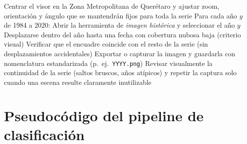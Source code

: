 \begin{algorithm}[H]
\caption{Procedimiento de adquisición manual con Google Earth}
\label{alg:adquisicion}
\begin{algorithmic}[1]
\State Centrar el visor en la Zona Metropolitana de Querétaro y ajustar zoom, orientación y ángulo que se mantendrán fijos para toda la serie
\State Para cada año $y$ de 1984 a 2020:
	\State \quad Abrir la herramienta de \textit{imagen histórica} y seleccionar el año $y$
	\State \quad Desplazarse dentro del año hasta una fecha con cobertura nubosa baja (criterio visual)
	\State \quad Verificar que el encuadre coincide con el resto de la serie (sin desplazamientos accidentales)
	\State \quad Exportar o capturar la imagen y guardarla con nomenclatura estandarizada (p.\ ej.\ \texttt{YYYY.png})
\State Revisar visualmente la continuidad de la serie (saltos bruscos, años atípicos) y repetir la captura solo cuando una escena resulte claramente inutilizable
\end{algorithmic}
\end{algorithm}

\section{Pseudocódigo del pipeline de clasificación}

